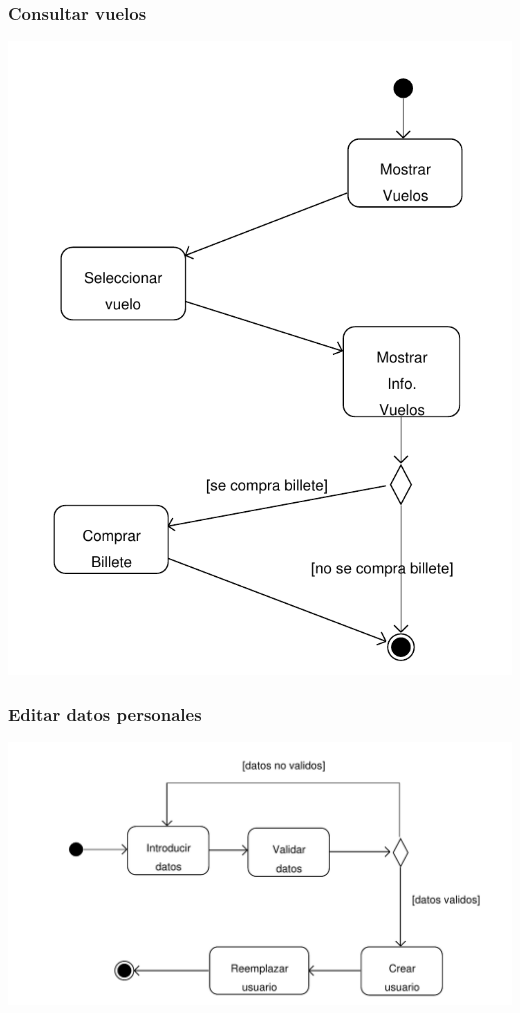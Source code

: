 \documentclass[11pt, a4paper, twoside, titlepage]{article}
\begin{document}
			\subsubsection{Consultar vuelos}
				\begin{center}
					\includegraphics[scale=.71]{analisis/diagramas/da_consultarvuelos.pdf}
				\end{center}
			
			\subsubsection{Editar datos personales}
				\begin{center}
					\includegraphics[scale=.86]{analisis/diagramas/da_editardatospersonales.pdf}
				\end{center}
\end{document}
